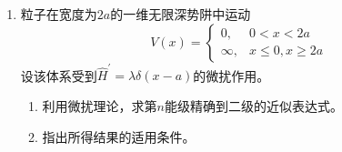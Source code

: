 \begin{enumerate}
{}



\item 
粒子在宽度为$ 2a $的一维无限深势阱中运动
\[ 
V(x)=
\left\{
\begin{array}{lr}
	0,&0<x<2a\\
	\infty, & x\leq 0,x\geq2a
\end{array}
\right.
 \]
设该体系受到$\hat{H} ^{\prime} =\lambda\delta(x-a)$的微扰作用。
\begin{enumerate}
	\item
利用微扰理论，求第$n$能级精确到二级的近似表达式。

\item 
指出所得结果的适用条件。
\end{enumerate}


\end{enumerate}

